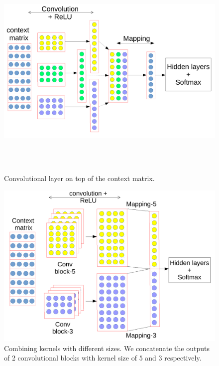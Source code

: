 ~ \begin{figure}[!t]
	\centering
~ \includegraphics[width=\columnwidth*3/4]{figures/convolution.pdf}
~ \caption{Convolutional	 layer on top of the context matrix.}  
~ \label{fig:simpleconv}
~ \end{figure}
%
\begin{figure}[!t]
\centering
\includegraphics[width=\columnwidth*3/4]{figures/combine.pdf}
\caption{Combining kernels with different sizes. We concatenate the outputs of 2 convolutional blocks with kernel size of $5$ and $3$ respectively.}  
\label{fig:combine}
\end{figure}